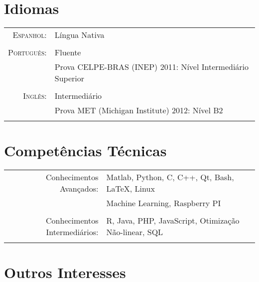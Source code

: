 \documentclass[a4paper,10pt]{article}
\begin{document}
\section{Idiomas}
\begin{tabular}{rl}

    \textsc{Espanhol:}      & Língua Nativa\\
                            &\\

    \textsc{Português:}     & Fluente\\
                            & Prova \textsc{CELPE-BRAS} (INEP) 2011: Nível Intermediário Superior\\
                            &\\

    \textsc{Inglês:}        & Intermediário\\
                            & Prova \textsc{MET} (Michigan Institute) 2012: Nível B2 \\
                            &\\

\end{tabular}

\section{Competências Técnicas}
\begin{tabular}{rl}

    Conhecimentos Avançados:        & Matlab, Python, C, C++, Qt, Bash, \LaTeX, Linux\\
                                    & Machine Learning, Raspberry PI\\
                                    &\\

    Conhecimentos Intermediários:   & R, Java, PHP, JavaScript, Otimização Não-linear, SQL\\
                                    &\\

\end{tabular}

\section{Outros Interesses}
\end{document}
